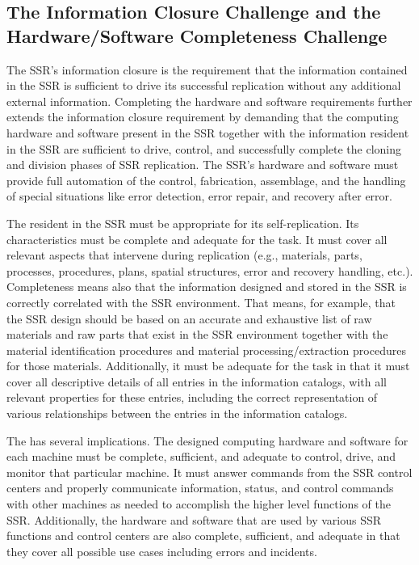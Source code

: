 \subsection[The Information Closure Challenge and the Hardware/Software
Completeness Challenge]{The Information Closure Challenge and the
\mbox{Hardware/Software} Completeness Challenge}

The SSR's information closure 
is the requirement that the information contained in the SSR is
sufficient to drive its successful replication without any additional
external information. Completing the hardware and software
requirements further extends the information closure
requirement by demanding that the computing hardware and software
present in the SSR together with the information resident in the SSR
are sufficient to drive, control, and successfully complete the cloning
and division phases of SSR replication. The SSR's hardware and
software must provide full automation of the control, fabrication,
assemblage, and the handling of special situations like error detection,
error repair, and recovery after error.

The  resident in the SSR must be
appropriate for its self-replication. Its characteristics must be complete and adequate for the task. It must cover all relevant aspects that intervene during replication (e.g., materials, parts, processes, procedures, plans, spatial structures, error and recovery handling, etc.). Completeness means also that the information designed and stored in the SSR is correctly correlated with the SSR environment. That means, for example, that the SSR design should be based on an accurate and exhaustive list of raw materials and raw parts that exist in the SSR environment together with the material identification procedures and material processing/extraction procedures for those materials. Additionally, it must be adequate for the task in that it must cover all descriptive details of all entries in the information catalogs, with all relevant properties for these entries, including the correct representation of various relationships between the entries in the information catalogs.

The  has several implications. The designed computing hardware and software for each machine must be complete, sufficient, and adequate to control, drive, and monitor that particular machine. It must answer commands from the SSR control centers and properly communicate information, status, and control commands with other machines as needed to accomplish the higher level functions of the SSR. Additionally, the hardware and software that are used by various SSR functions and control centers are also complete, sufficient, and adequate in that they cover all possible use cases including errors and incidents.

